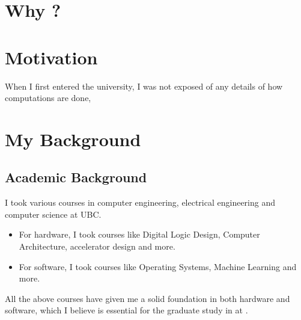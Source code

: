 \documentclass[a4 paper, 10pt]{article}
\begin{document}
{\section*{Why \theSchoolFullName{}?}


\section*{Motivation}
When I first entered the university, I was not exposed of any details of how computations are done,
\section*{My Background}

\subsection*{Academic Background}
I took various courses in computer engineering, electrical engineering and computer science at UBC. 

\begin{itemize}
    \item For hardware, I took courses like Digital Logic Design, Computer Architecture, accelerator design and more. 
    \item For software, I took courses like Operating Systems, Machine Learning and more.
\end{itemize}

All the above courses have given me a solid foundation in both hardware and software, which I believe is essential for the graduate study in \theDepartment{} at \theSchoolFullName{}.

}
\end{document}
